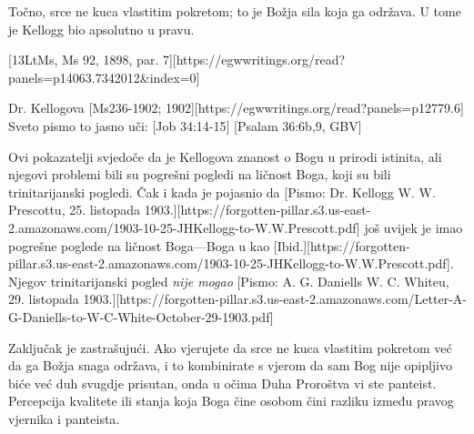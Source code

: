Točno, srce ne kuca vlastitim pokretom; to je Božja sila koja ga održava. U tome je Kellogg bio apsolutno u pravu.

[13LtMs, Ms 92, 1898, par. 7][https://egwwritings.org/read?panels=p14063.7342012&index=0]

Dr. Kellogova [Ms236-1902; 1902][https://egwwritings.org/read?panels=p12779.6] Sveto pismo to jasno uči: [Job 34:14-15] [Psalam 36:6b,9, GBV]

Ovi pokazatelji svjedoče da je Kellogova znanost o Bogu u prirodi istinita, ali njegovi problemi bili su pogrešni pogledi na ličnost Boga, koji su bili trinitarijanski pogledi. Čak i kada je pojasnio da [Pismo: Dr. Kellogg W. W. Prescottu, 25. listopada 1903.][https://forgotten-pillar.s3.us-east-2.amazonaws.com/1903-10-25-JHKellogg-to-W.W.Prescott.pdf] još uvijek je imao pogrešne poglede na ličnost Boga—Boga u  kao [Ibid.][https://forgotten-pillar.s3.us-east-2.amazonaws.com/1903-10-25-JHKellogg-to-W.W.Prescott.pdf]. Njegov trinitarijanski pogled \textit{nije mogao} [Pismo: A. G. Daniells W. C. Whiteu, 29. listopada 1903.][https://forgotten-pillar.s3.us-east-2.amazonaws.com/Letter-A-G-Daniells-to-W-C-White-October-29-1903.pdf]

Zaključak je zastrašujući. Ako vjerujete da srce ne kuca vlastitim pokretom već da ga Božja snaga održava, i to kombinirate s vjerom da sam Bog nije opipljivo biće već duh svugdje prisutan, onda u očima Duha Proroštva vi ste panteist. Percepcija kvalitete ili stanja koja Boga čine osobom čini razliku između pravog vjernika i panteista.
